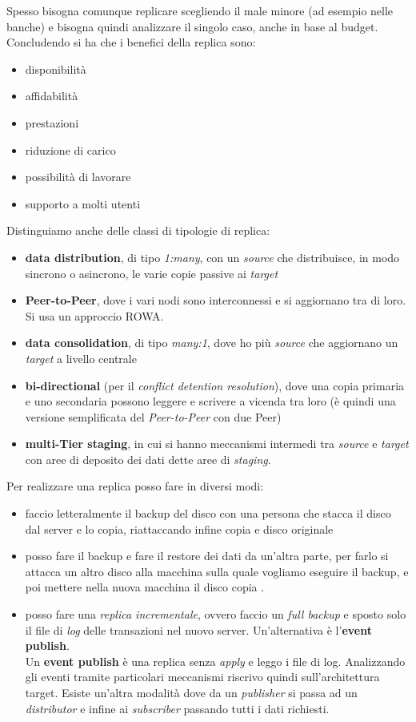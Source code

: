 Spesso bisogna comunque replicare scegliendo il male minore (ad esempio nelle banche) e bisogna quindi analizzare il singolo caso, anche in base al budget.\\ Concludendo si ha che i benefici della replica sono: 
\begin{itemize} 
    \item disponibilità 
    \item affidabilità 
    \item prestazioni 
    \item riduzione di carico 
    \item possibilità di lavorare 
    \item supporto a molti utenti 
\end{itemize}
Distinguiamo anche delle classi di tipologie di replica: 
\begin{itemize} 
    \item \textbf{data distribution}, di tipo \textit{1:many}, con un \textit{source} che distribuisce, in modo sincrono o asincrono, le varie copie passive ai \textit{target} 
    \item \textbf{Peer-to-Peer}, dove i vari nodi sono interconnessi e si aggiornano tra di loro. Si usa un approccio ROWA.
    \item \textbf{data consolidation}, di tipo \textit{many:1}, dove ho più \textit{source} che aggiornano un \textit{target} a livello centrale 
    \item \textbf{bi-directional} (per il \textit{conflict detention resolution}), dove una copia primaria e uno secondaria possono leggere e scrivere a vicenda tra loro (è quindi una versione semplificata del \textit{Peer-to-Peer} con due Peer) 
    \item \textbf{multi-Tier staging}, in cui si hanno meccanismi intermedi tra \textit{source} e \textit{target} con aree di deposito dei dati dette aree di \textit{staging}.
\end{itemize}
Per realizzare una replica posso fare in diversi modi:
\begin{itemize}
    \item faccio letteralmente il backup del disco con una persona che stacca il disco dal server e lo copia, riattaccando infine copia e disco originale 
    \item posso fare il backup e fare il restore dei dati da un'altra parte, per farlo si attacca un altro disco alla macchina sulla quale vogliamo eseguire il backup, e poi mettere nella nuova macchina il disco copia .
    \item posso fare una \textit{replica incrementale}, ovvero faccio un \textit{full backup} e sposto solo il file di \textit{log} delle transazioni nel nuovo server. Un'alternativa è l'\textbf{event publish}. \\ Un \textbf{event publish} è una replica senza \textit{apply} e leggo i file di log. Analizzando gli eventi tramite particolari meccanismi riscrivo quindi sull'architettura target. Esiste un'altra modalità dove da un \textit{publisher} si passa ad un \textit{distributor} e infine ai \textit{subscriber} passando tutti i dati richiesti. 
\end{itemize}